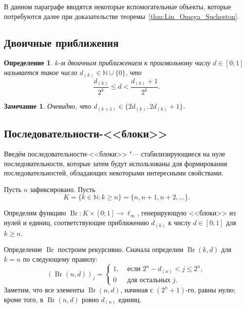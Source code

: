 \documentclass[a4paper,14pt]{article} %
\theoremstyle{plain}
\newtheorem{remark}[lemma]{Замечание}
\newtheorem{definition}[lemma]{Определение}
\begin{document}
В данном параграфе вводятся некоторые вспомогательные объекты,
которые потребуются далее при доказательстве теоремы~\ref{thm:Lin_Omega_Sucheston}.

\subsection{Двоичные приближения}	

\begin{definition}
	$k$-м двоичным приближением к произвольному числу $d\in[0;1]$
	называется такое число $d_{(k)}\in\mathbb{N}\cup\{0\}$,
	что
	\begin{equation}
		\label{eq:binary_approximations_for_number}
		\frac{d_{(k)}}{2^k} \leq d < \frac{d_{(k)}+1}{2^k}
		.
	\end{equation}
\end{definition}

\begin{remark}
	Очевидно, что $d_{(k+1)}\in\{2d_{(k)},2d_{(k)}+1\}$.
\end{remark}

\subsection{Последовательности-<<блоки>>}

Введём последовательности-<<блоки>> "---
стабилизирующиеся на нуле последовательности,
которые затем будут использованы для формирования последовательностей,
обладающих некоторыми интересными свойствами.

Пусть $n$ зафиксировано.
Пусть
\begin{equation}
	K = \{k\in\mathbb{N} : k \geq n\} = \{n, n+1, n+2, ...\}
	.
\end{equation}


Определим функцию $\operatorname{Br}:K\times [0;1] \to \ell_\infty$,
генерирующую <<блоки>> из нулей и единиц,
соответствующие приближению $d_{(k)}$ к числу $d\in[0;1]$ для $k \geq n$.

Определение $\operatorname{Br}$ построим рекурсивно.
Сначала определим $\operatorname{Br}(k,d)$ для $k=n$ по следующему правилу:
\begin{equation}
	(\operatorname{Br}(n,d))_j = \begin{cases}
		1, & \mbox{~если~} 2^n - d_{(n)} < j \leq 2^n,
		\\
		0  & \mbox{~для остальных~} j
		.
	\end{cases}
\end{equation}
Заметим, что все элементы $\operatorname{Br}(n,d)$, начиная с $(2^n+1)$-го, равны нулю;
кроме того, в $\operatorname{Br}(n,d)$ ровно $d_{(n)}$ единиц.
\end{document}
